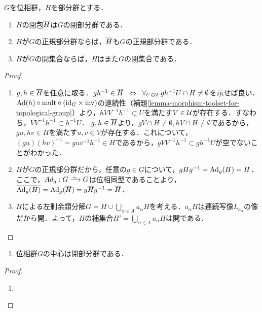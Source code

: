 \documentclass[uplatex,dvipdfmx]{jsreport}
\begin{document}
\begin{lemma}[部分群の位相]
    $G$を位相群，$H$を部分群とする．
    \begin{enumerate}
        \item $H$の閉包$\overline{H}$は$G$の閉部分群である．
        \item $H$が$G$の正規部分群ならば，$\overline{H}$も$G$の正規部分群である．
        \item $H$が$G$の開集合ならば，$H$はまた$G$の閉集合である．
    \end{enumerate}
\end{lemma}
\begin{proof}\mbox{}
    \begin{enumerate}
        \item $g,h\in\overline{H}$を任意に取る．$gh^{-1}\in\overline{H}\;\;\Leftrightarrow\;\;\forall_{U\in\mathcal{U}}\;gh^{-1}U\cap H\ne\emptyset$を示せば良い．
        $\mathrm{Ad}(h)\circ\mathrm{mult}\circ(\mathrm{id}_G\times\mathrm{inv})$の連続性（補題\ref{lemma-morphism-toolset-for-topological-group}）より，$hVV^{-1}h^{-1}\subset U$を満たす$V\in\mathcal{U}$が存在する．すなわち，$VV^{-1}h^{-1}\subset h^{-1}U$．
        $g,h\in\overline{H}$より，$gV\cap H\ne\emptyset,hV\cap H\ne\emptyset$であるから，$gu,hv\in H$を満たす$u,v\in V$が存在する．これについて，$(gu)(hv)^{-1}=guv^{-1}h^{-1}\in H$であるから，$gVV^{-1}h^{-1}\subset gh^{-1}U$が空でないことがわかった．
        \item 
        $H$が$G$の正規部分群だから，任意の$g\in G$について，$gHg^{-1}=\mathrm{Ad}_g(H)=H$．ここで，$Ad_g:G\iso G$は位相同型であることより，$\overline{\mathrm{Ad}_g(H)}=\mathrm{Ad}_g(\overline{H})=g\overline{H}g^{-1}=\overline{H}$．
        \item $H$による左剰余類分解$G=H\cup\bigcup_{\alpha\in A}a_\alpha H$を考える．$a_\alpha H$は連続写像$L_{a_\alpha}$の像だから開．よって，$H$の補集合$H'=\bigcup_{\alpha\in A}a_{\alpha}H$は開である．
    \end{enumerate}
\end{proof}

\begin{lemma}[部分群の例]\mbox{}
    \begin{enumerate}
        \item 位相群$G$の中心は閉部分群である．
    \end{enumerate}
\end{lemma}
\begin{proof}\mbox{}
    \begin{enumerate}
        \item 
    \end{enumerate}
\end{proof}
\end{document}
